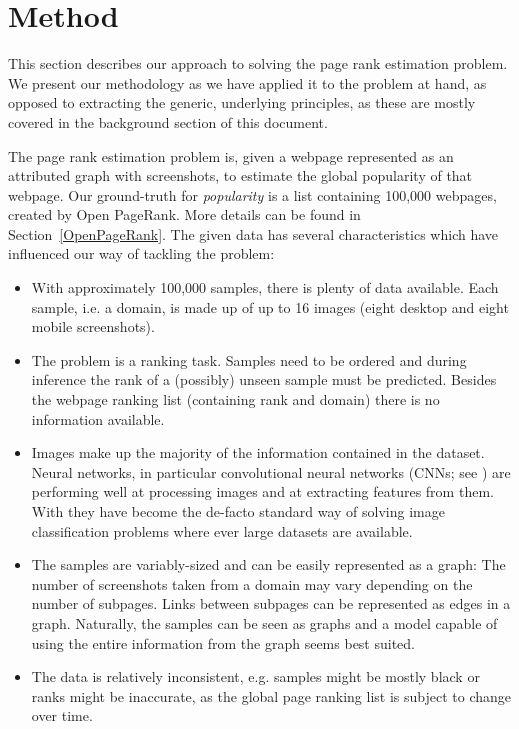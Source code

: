 \section{Method}
\label{sec:method}

This section describes our approach to solving the page rank estimation problem. We present our methodology as we have applied it to the problem at hand, as opposed to extracting the generic, underlying principles, as these are mostly covered in the background section of this document.

The page rank estimation problem is, given a webpage represented as an attributed graph with screenshots, to estimate the global popularity of that webpage.
Our ground-truth for \textit{popularity} is a list containing 100,000 webpages, created by Open PageRank.
More details can be found in Section~\ref{OpenPageRank}.
The given data has several characteristics which have influenced our way of tackling the problem:

\begin{itemize}
    \item With approximately 100,000 samples, there is plenty of data available. Each sample, i.e. a domain, is made up of up to 16 images (eight desktop and eight mobile screenshots).
    \item The problem is a ranking task. Samples need to be ordered and during inference the rank of a (possibly) unseen sample must be predicted. Besides the webpage ranking list (containing rank and domain) there is no information available.
    \item Images make up the majority of the information contained in the dataset. Neural networks, in particular convolutional neural networks (CNNs; see \cite{lecun1989backpropagation}) are performing well at processing images and at extracting features from them. With \cite{krizhevsky:imagenet} they have become the de-facto standard way of solving image classification problems where ever large datasets are available.
    \item The samples are variably-sized and can be easily represented as a graph: The number of screenshots taken from a domain may vary depending on the number of subpages. Links between subpages can be represented as edges in a graph. Naturally, the samples can be seen as graphs and a model capable of using the entire information from the graph seems best suited.
    \item The data is relatively inconsistent, e.g. samples might be mostly black or ranks might be inaccurate, as the global page ranking list is subject to change over time.
\end{itemize}

